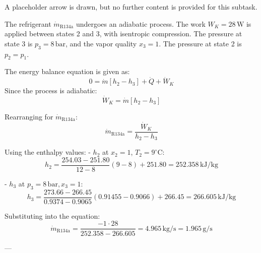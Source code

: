 A placeholder arrow is drawn, but no further content is provided for this subtask.

The refrigerant \( \dot{m}_{\text{R134a}} \) undergoes an adiabatic process. The work \( W_K = 28 \, \text{W} \) is applied between states 2 and 3, with isentropic compression. The pressure at state 3 is \( p_3 = 8 \, \text{bar} \), and the vapor quality \( x_3 = 1 \). The pressure at state 2 is \( p_2 = p_1 \).  

The energy balance equation is given as:  
\[
0 = \dot{m} \left[ h_2 - h_3 \right] + \dot{Q} + \dot{W}_K
\]  
Since the process is adiabatic:  
\[
\dot{W}_K = \dot{m} \left[ h_2 - h_3 \right]
\]  

Rearranging for \( \dot{m}_{\text{R134a}} \):  
\[
\dot{m}_{\text{R134a}} = \frac{\dot{W}_K}{h_2 - h_3}
\]  

Using the enthalpy values:  
- \( h_2 \) at \( x_2 = 1 \), \( T_2 = 9^\circ\text{C} \):  
\[
h_2 = \frac{254.03 - 251.80}{12 - 8} (9 - 8) + 251.80 = 252.358 \, \text{kJ/kg}
\]  

- \( h_3 \) at \( p_3 = 8 \, \text{bar}, x_3 = 1 \):  
\[
h_3 = \frac{273.66 - 266.45}{0.9374 - 0.9065} (0.91455 - 0.9066) + 266.45 = 266.605 \, \text{kJ/kg}
\]  

Substituting into the equation:  
\[
\dot{m}_{\text{R134a}} = \frac{-1 \cdot 28}{252.358 - 266.605} = 4.965 \, \text{kg/s} = 1.965 \, \text{g/s}
\]  

---